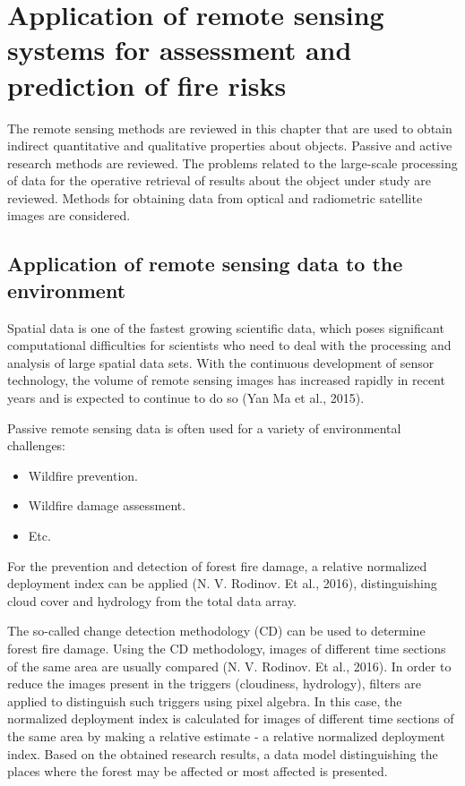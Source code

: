 \chapter{Application of remote sensing systems for assessment and prediction of fire risks}
	\label{cha:literature}

	The remote sensing methods are reviewed in this chapter that are used to obtain indirect quantitative and qualitative properties about objects. Passive and active research methods are reviewed. The problems related to the large-scale processing of data for the operative retrieval of results about the object under study are reviewed. Methods for obtaining data from optical and radiometric satellite images are considered.

\section{Application of remote sensing data to the environment}
	Spatial data is one of the fastest growing scientific data, which poses significant computational difficulties for scientists who need to deal with the processing and analysis of large spatial data sets. With the continuous development of sensor technology, the volume of remote sensing images has increased rapidly in recent years and is expected to continue to do so (Yan Ma et al., 2015).
	
	Passive remote sensing data is often used for a variety of environmental challenges:
\begin{itemize}
	\item Wildfire prevention.
	\item Wildfire damage assessment.
	\item Etc.
\end{itemize}

	For the prevention and detection of forest fire damage, a relative normalized deployment index can be applied (N. V. Rodinov. Et al., 2016), distinguishing cloud cover and hydrology from the total data array.

	The so-called change detection methodology (CD) can be used to determine forest fire damage. Using the CD methodology, images of different time sections of the same area are usually compared (N. V. Rodinov. Et al., 2016). In order to reduce the images present in the triggers (cloudiness, hydrology), filters are applied to distinguish such triggers using pixel algebra. In this case, the normalized deployment index is calculated for images of different time sections of the same area by making a relative estimate - a relative normalized deployment index. Based on the obtained research results, a data model distinguishing the places where the forest may be affected or most affected is presented.
	
